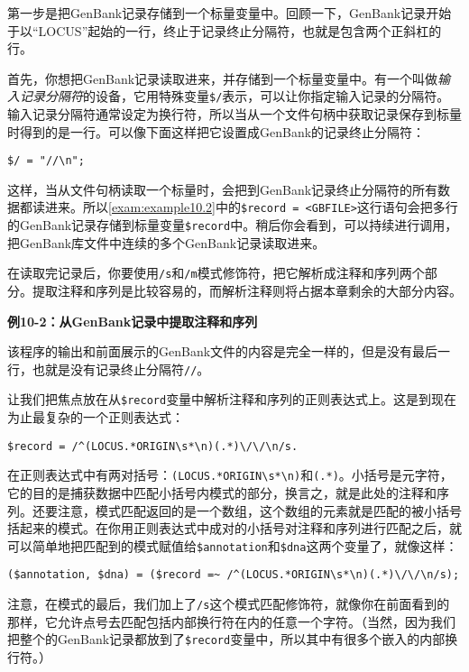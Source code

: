 第一步是把GenBank记录存储到一个标量变量中。回顾一下，GenBank记录开始于以“LOCUS”起始的一行，终止于记录终止分隔符，也就是包含两个正斜杠的行。

首先，你想把GenBank记录读取进来，并存储到一个标量变量中。有一个叫做\textit{输入记录分隔符}的设备，它用特殊变量\verb|$/|表示，可以让你指定输入记录的分隔符。输入记录分隔符通常设定为换行符，所以当从一个文件句柄中获取记录保存到标量时得到的是一行。可以像下面这样把它设置成GenBank的记录终止分隔符：

\begin{lstlisting}
$/ = "//\n";
\end{lstlisting}

这样，当从文件句柄读取一个标量时，会把到GenBank记录终止分隔符的所有数据都读进来。所以\autoref{exam:example10.2}中的\verb|$record = <GBFILE>|这行语句会把多行的GenBank记录存储到标量变量\verb|$record|中。稍后你会看到，可以持续进行调用，把GenBank库文件中连续的多个GenBank记录读取进来。

在读取完记录后，你要使用\verb|/s|和\verb|/m|模式修饰符，把它解析成注释和序列两个部分。提取注释和序列是比较容易的，而解析注释则将占据本章剩余的大部分内容。

\textbf{例10-2：从GenBank记录中提取注释和序列}


该程序的输出和前面展示的GenBank文件的内容是完全一样的，但是没有最后一行，也就是没有记录终止分隔符\verb|//|。

让我们把焦点放在从\verb|$record|变量中解析注释和序列的正则表达式上。这是到现在为止最复杂的一个正则表达式：

\begin{lstlisting}
$record = /^(LOCUS.*ORIGIN\s*\n)(.*)\/\/\n/s.
\end{lstlisting}

在正则表达式中有两对括号：\verb|(LOCUS.*ORIGIN\s*\n)|和\verb|(.*)|。小括号是元字符，它的目的是捕获数据中匹配小括号内模式的部分，换言之，就是此处的注释和序列。还要注意，模式匹配返回的是一个数组，这个数组的元素就是匹配的被小括号括起来的模式。在你用正则表达式中成对的小括号对注释和序列进行匹配之后，就可以简单地把匹配到的模式赋值给\verb|$annotation|和\verb|$dna|这两个变量了，就像这样：

\begin{lstlisting}
($annotation, $dna) = ($record =~ /^(LOCUS.*ORIGIN\s*\n)(.*)\/\/\n/s);
\end{lstlisting}

注意，在模式的最后，我们加上了\verb|/s|这个模式匹配修饰符，就像你在前面看到的那样，它允许点号去匹配包括内部换行符在内的任意一个字符。（当然，因为我们把整个的GenBank记录都放到了\verb|$record|变量中，所以其中有很多个嵌入的内部换行符。）

